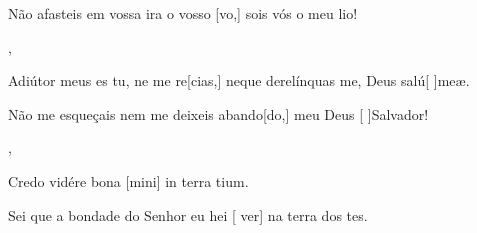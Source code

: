 {    {\item {}Não afasteis em vossa ira o vosso [vo,] sois vós o meu lio!~\Responsorium},
  {\item {}Adiútor meus es tu, ne me re[cias,] neque derelínquas me, Deus salú[ ]{me}æ.~\Responsorium}%
    {\item {}Não me esqueçais nem me deixeis abando[do,] meu Deus [ ]{Sal}vador!~\Responsorium},
  {\item {}Credo vidére bona [mini] in terra tium.~\Responsorium}%
    {\item {}Sei que a bondade do Senhor eu hei [ ver] na terra dos tes.~\Responsorium}
}